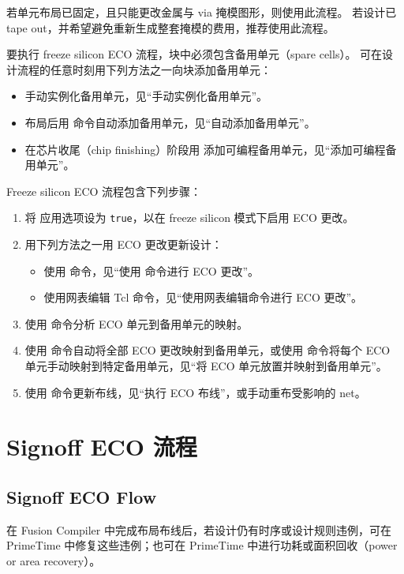 若单元布局已固定，且只能更改金属与 via 掩模图形，则使用此流程。
若设计已 tape out，并希望避免重新生成整套掩模的费用，推荐使用此流程。

要执行 freeze silicon ECO 流程，块中必须包含备用单元（spare cells）。
可在设计流程的任意时刻用下列方法之一向块添加备用单元：
\begin{itemize}
  \item 手动实例化备用单元，见``手动实例化备用单元''。
  \item 布局后用  命令自动添加备用单元，见``自动添加备用单元''。
  \item 在芯片收尾（chip finishing）阶段用  添加可编程备用单元，见``添加可编程备用单元''。
\end{itemize}

Freeze silicon ECO 流程包含下列步骤：
\begin{enumerate}
  \item 将  应用选项设为 \texttt{true}，以在 freeze silicon 模式下启用 ECO 更改。
  \item 用下列方法之一用 ECO 更改更新设计：
  \begin{itemize}
    \item 使用  命令，见``使用  命令进行 ECO 更改''。
    \item 使用网表编辑 Tcl 命令，见``使用网表编辑命令进行 ECO 更改''。
  \end{itemize}
  \item 使用  命令分析 ECO 单元到备用单元的映射。
  \item 使用  命令自动将全部 ECO 更改映射到备用单元，或使用  命令将每个 ECO 单元手动映射到特定备用单元，见``将 ECO 单元放置并映射到备用单元''。
  \item 使用  命令更新布线，见``执行 ECO 布线''，或手动重布受影响的 net。
\end{enumerate}

\section{Signoff ECO 流程}
\subsection*{Signoff ECO Flow}

在 Fusion Compiler 中完成布局布线后，若设计仍有时序或设计规则违例，可在 PrimeTime 中修复这些违例；也可在 PrimeTime 中进行功耗或面积回收（power or area recovery）。

